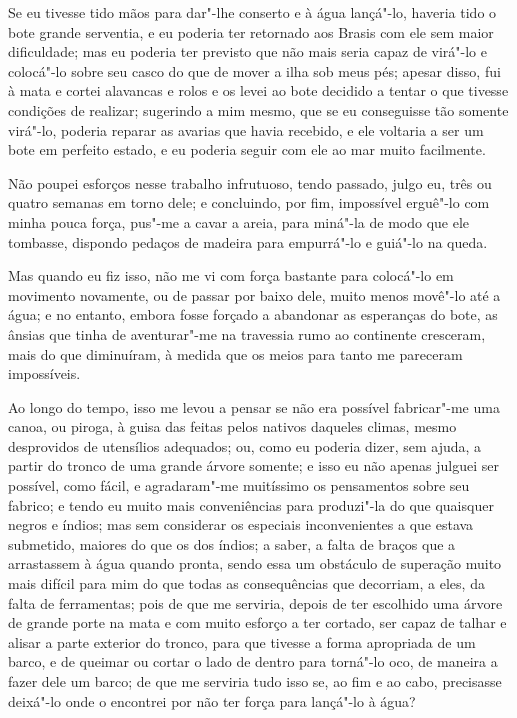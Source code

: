 Se eu tivesse tido mãos para dar"-lhe conserto e à água lançá"-lo, haveria
tido o bote grande serventia, e eu poderia ter retornado aos Brasis com
ele sem maior dificuldade; mas eu poderia ter previsto que não mais
seria capaz de virá"-lo e colocá"-lo sobre seu casco do que de mover a
ilha sob meus pés; apesar disso, fui à mata e cortei alavancas e rolos e
os levei ao bote decidido a tentar o que tivesse condições de realizar;
sugerindo a mim mesmo, que se eu conseguisse tão somente virá"-lo,
poderia reparar as avarias que havia recebido, e ele voltaria a ser um
bote em perfeito estado, e eu poderia seguir com ele ao mar muito
facilmente.

Não poupei esforços nesse trabalho infrutuoso, tendo passado, julgo eu,
três ou quatro semanas em torno dele; e concluindo, por fim, impossível
erguê"-lo com minha pouca força, pus"-me a cavar a areia, para miná"-la de
modo que ele tombasse, dispondo pedaços de madeira para empurrá"-lo e
guiá"-lo na queda.

Mas quando eu fiz isso, não me vi com força bastante para colocá"-lo em
movimento novamente, ou de passar por baixo dele, muito menos movê"-lo
até a água; e no entanto, embora fosse forçado a abandonar as esperanças
do bote, as ânsias que tinha de aventurar"-me na travessia rumo ao
continente cresceram, mais do que diminuíram, à medida que os meios para
tanto me pareceram impossíveis.

Ao longo do tempo, isso me levou a pensar se não era possível
fabricar"-me uma canoa, ou piroga, à guisa das feitas pelos nativos
daqueles climas, mesmo desprovidos de utensílios adequados; ou, como eu
poderia dizer, sem ajuda, a partir do tronco de uma grande árvore
somente; e isso eu não apenas julguei ser possível, como fácil, e
agradaram"-me muitíssimo os pensamentos sobre seu fabrico; e tendo eu
muito mais conveniências para produzi"-la do que quaisquer negros e
índios; mas sem considerar os especiais inconvenientes a que estava
submetido, maiores do que os dos índios; a saber, a falta de braços que
a arrastassem à água quando pronta, sendo essa um obstáculo de superação
muito mais difícil para mim do que todas as consequências que decorriam,
a eles, da falta de ferramentas; pois de que me serviria, depois de ter
escolhido uma árvore de grande porte na mata e com muito esforço a ter
cortado, ser capaz de talhar e alisar a parte exterior do tronco, para
que tivesse a forma apropriada de um barco, e de queimar ou cortar o
lado de dentro para torná"-lo oco, de maneira a fazer dele um barco; de
que me serviria tudo isso se, ao fim e ao cabo, precisasse deixá"-lo onde
o encontrei por não ter força para lançá"-lo à água?

